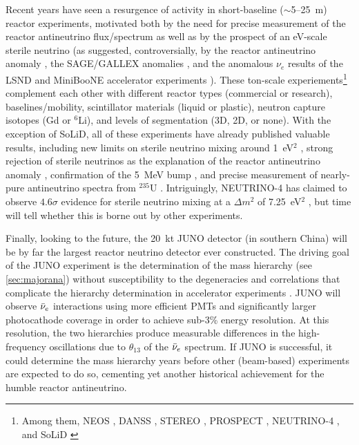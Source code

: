 \documentclass[../thesis.tex]{subfiles}
\begin{document}
Recent years have seen a resurgence of activity in short-baseline ($\sim$5--25~m) reactor experiments, motivated both by the need for precise measurement of the reactor antineutrino flux/spectrum as well as by the prospect of an eV-scale sterile neutrino (as suggested, controversially, by the reactor antineutrino anomaly \cite{PhysRevD.83.073006}, the SAGE/GALLEX anomalies \cite{PhysRevC.80.015807,KAETHER201047}, and the anomalous $\nu_e$ results of the LSND and MiniBooNE accelerator experiments \cite{PhysRevD.64.112007,PhysRevLett.121.221801}). These ton-scale experiements\footnote{Among them, NEOS \cite{Ko:2019cip}, DANSS \cite{Alekseev_2016}, STEREO \cite{Allemandou_2018}, PROSPECT \cite{ASHENFELTER2019287}, NEUTRINO-4 \cite{Serebrov:2020kmd}, and SoLiD \cite{Abreu_2021}} complement each other with different reactor types (commercial or research), baselines/mobility, scintillator materials (liquid or plastic), neutron capture isotopes (Gd or $^6$Li), and levels of segmentation (3D, 2D, or none). With the exception of SoLiD, all of these experiments have already published valuable results, including new limits on sterile neutrino mixing around 1~eV$^2$ \cite{PhysRevLett.118.121802,Svirida:2019kbq,PhysRevD.102.052002,PhysRevD.103.032001}, strong rejection of sterile neutrinos as the explanation of the reactor antineutrino anomaly \cite{PhysRevD.102.052002,PhysRevD.103.032001}, confirmation of the 5~MeV bump \cite{PhysRevLett.118.121802}, and precise measurement of nearly-pure antineutrino spectra from $^{235}$U \cite{PhysRevD.103.032001}. Intriguingly, NEUTRINO-4 has claimed to observe $4.6\sigma$ evidence for sterile neutrino mixing at a $\Delta m^2$ of 7.25~eV$^2$ \cite{Serebrov_2020}, but time will tell whether this is borne out by other experiments.

Finally, looking to the future, the 20~kt JUNO detector \cite{juno} (in southern China) will be by far the largest reactor neutrino detector ever constructed. The driving goal of the JUNO experiment is the determination of the mass hierarchy (see \autoref{sec:majorana}) without susceptibility to the degeneracies and correlations that complicate the hierarchy determination in accelerator experiments \cite{Ghosh:2017sli}. JUNO will observe $\bar\nu_e$ interactions using more efficient PMTs and significantly larger photocathode coverage in order to achieve sub-3\% energy resolution. At this resolution, the two hierarchies produce measurable differences in the high-frequency oscillations due to $\theta_{13}$ of the $\bar\nu_e$ spectrum. If JUNO is successful, it could determine the mass hierarchy years before other (beam-based) experiments are expected to do so, cementing yet another historical achievement for the humble reactor antineutrino.
\end{document}
